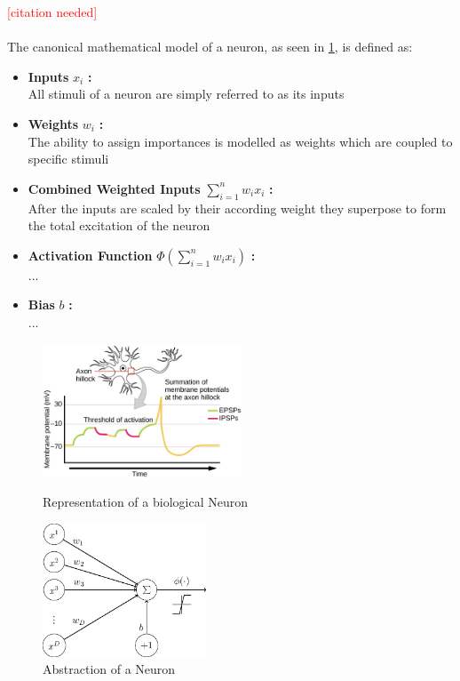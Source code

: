 \textcolor{red}{[citation needed]}\\
\\
The canonical mathematical model of a neuron, as seen in \ref{fig:neuron2}, is defined as:
\begin{itemize}
	\item \textbf{Inputs} $x_i$ \textbf{:}\\
	All stimuli of a neuron are simply referred to as its inputs
	\item \textbf{Weights} $w_i$ \textbf{:}\\
	The ability to assign importances is modelled as weights which are coupled to specific stimuli
	\item \textbf{Combined Weighted Inputs} $\sum_{i=1}^{n}w_i x_i$ \textbf{:}\\
	After the inputs are scaled by their according weight they superpose to form the total excitation of the neuron
	\item \textbf{Activation Function} $\Phi(\sum_{i=1}^{n}w_i x_i)$ \textbf{:}\\
	...
	\item \textbf{Bias} $b$ \textbf{:}\\  
	...
\end{itemize}


\begin{figure}
	\centering
	\begin{minipage}{0.45\textwidth}
		\centering
		\includegraphics[height=150px]{gfx/Biological_Neuron.jpg}
		\caption{Representation of a biological Neuron}
		\label{fig:neuron1}
	\end{minipage}\hfill
	\begin{minipage}{0.45\textwidth}
		\centering
		\includegraphics[height=150px]{gfx/Abstract_Neuron.png}
		\caption{Abstraction of a Neuron}
		\label{fig:neuron2}
	\end{minipage}
\end{figure}


